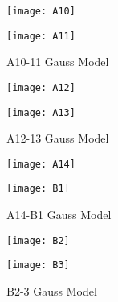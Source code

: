 \documentclass[withoutpreface,bwprint]{cumcmthesis} %
\begin{document}
\newpage
\begin{figure}[!h]
	\centering
	\begin{minipage}[c]{0.45\textwidth}
		\centering
		\texttt{[image: A10]}
		\label{fig:sample-figure-a}
	\end{minipage}
	\begin{minipage}[c]{0.45\textwidth}
		\centering
		\texttt{[image: A11]}
		\label{fig:sample-figure-b}
	\end{minipage}
	\caption{A10-11 Gauss Model}
	\label{fig:sample-figure}
\end{figure}

\begin{figure}[!h]
	\centering
	\begin{minipage}[c]{0.45\textwidth}
		\centering
		\texttt{[image: A12]}
		\label{fig:sample-figure-a}
	\end{minipage}
	\begin{minipage}[c]{0.45\textwidth}
		\centering
		\texttt{[image: A13]}
		\label{fig:sample-figure-b}
	\end{minipage}
	\caption{A12-13 Gauss Model}
	\label{fig:sample-figure}
\end{figure}

\begin{figure}[!h]
	\centering
	\begin{minipage}[c]{0.45\textwidth}
		\centering
		\texttt{[image: A14]}
		\label{fig:sample-figure-a}
	\end{minipage}
	\begin{minipage}[c]{0.45\textwidth}
		\centering
		\texttt{[image: B1]}
		\label{fig:sample-figure-b}
	\end{minipage}
	\caption{A14-B1 Gauss Model}
	\label{fig:sample-figure}
\end{figure}


\begin{figure}[!h]
	\centering
	\begin{minipage}[c]{0.45\textwidth}
		\centering
		\texttt{[image: B2]}
		\label{fig:sample-figure-a}
	\end{minipage}
	\begin{minipage}[c]{0.45\textwidth}
		\centering
		\texttt{[image: B3]}
		\label{fig:sample-figure-b}
	\end{minipage}
	\caption{B2-3 Gauss Model}
	\label{fig:sample-figure}
\end{figure}
\end{document}
